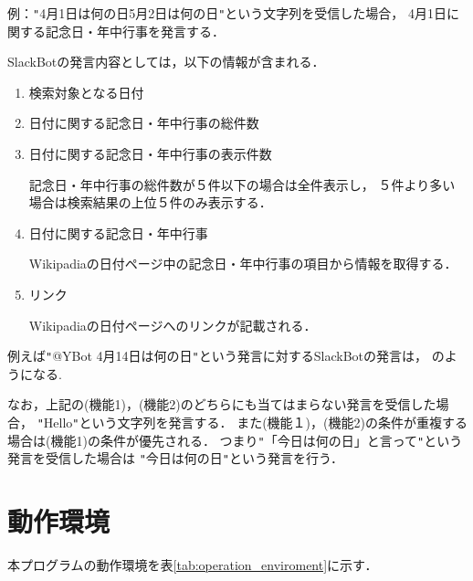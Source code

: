 \documentclass[fleqn, 14pt]{extarticlej}
\begin{document}
\begin{description}
\begin{enumerate}
    例：\verb|"|4月1日は何の日5月2日は何の日\verb|"|という文字列を受信した場合，
    4月1日に関する記念日・年中行事を発言する．     
  \end{enumerate}

  SlackBotの発言内容としては，以下の情報が含まれる．
  \begin{enumerate}
  \item{検索対象となる日付}
  \item{日付に関する記念日・年中行事の総件数}
  \item{日付に関する記念日・年中行事の表示件数}
    
    記念日・年中行事の総件数が５件以下の場合は全件表示し，
    ５件より多い場合は検索結果の上位５件のみ表示する．
  \item{日付に関する記念日・年中行事}
    
    Wikipadiaの日付ページ中の記念日・年中行事の項目から情報を取得する．
  \item{リンク}
    
    Wikipadiaの日付ページへのリンクが記載される．
  \end{enumerate}

  例えば\verb|"|@YBot 4月14日は何の日\verb|"|という発言に対するSlackBotの発言は，
  のようになる.


\end{description}

なお，上記の(機能1)，(機能2)のどちらにも当てはまらない発言を受信した場合，
\verb|"|Hello\verb|"|という文字列を発言する．
また(機能１)，(機能2)の条件が重複する場合は(機能1)の条件が優先される．
つまり\verb|"|「今日は何の日」と言って\verb|"|という発言を受信した場合は
\verb|"|今日は何の日\verb|"|という発言を行う．

\section{動作環境}
\label{sec:operation_enviroment}
本プログラムの動作環境を表\ref{tab:operation_enviroment}に示す．
\end{document}
